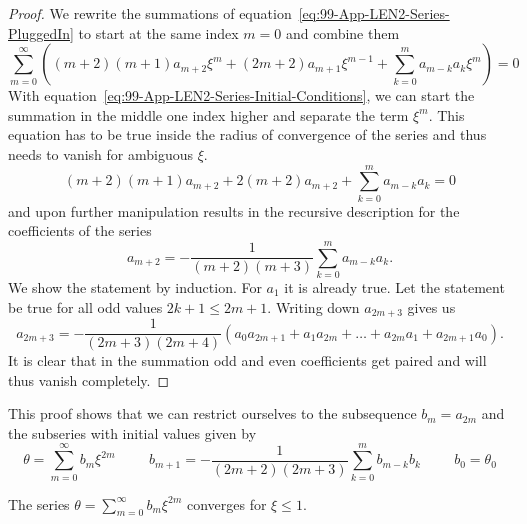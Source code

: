 \begin{proof}
	We rewrite the summations of equation~\ref{eq:99-App-LEN2-Series-PluggedIn} to start at the
	same index $m=0$ and combine them
	\begin{equation}
		\sum\limits_{m=0}^\infty\left((m+2)(m+1)a_{m+2}\xi^{m}+(2m+2)a_{m+1}\xi^{m-1} + \sum\limits_{k=0}^m a_{m-k}a_k\xi^m\right) = 0
		\label{eq:99-App-LE-New-Recursive-1}
	\end{equation}
	With equation~\ref{eq:99-App-LEN2-Series-Initial-Conditions}, we can start the summation
	in the middle one index higher and separate the term $\xi^m$.
	This equation has to be true
	inside the radius of convergence of the series and thus needs to vanish for ambiguous $\xi$.
	\begin{equation}
		(m+2)(m+1)a_{m+2}+2(m+2)a_{m+2}+\sum\limits_{k=0}^m a_{m-k}a_k = 0
		\label{eq:99-App-LE-New-Recursive-2}
	\end{equation}
	and upon further manipulation results in the recursive description for the coefficients
	of the series
	\begin{equation}
		a_{m+2} = -\frac{1}{(m+2)(m+3)}\sum\limits_{k=0}^m a_{m-k}a_k.
		\label{eq:99-App-LEN2-Recursive-Coefficients}
	\end{equation}
	We show the statement by induction.
	For $a_1$ it is already true.
	Let the statement be true for all odd values $2k+1\leq2m+1$.
	Writing down $a_{2m+3}$ gives us
	\begin{equation}
		a_{2m+3} = -\frac{1}{(2m+3)(2m+4)}\left(a_0 a_{2m+1}+a_1 a_{2m}+\dots+a_{2m}a_1+a_{2m+1}a_0\right).
		\label{eq:99-App-LE-New-Recursive-3}
	\end{equation}
	It is clear that in the summation odd and even coefficients get paired and will thus
	vanish completely.
\end{proof}
This proof shows that we can restrict ourselves to the subsequence $b_m=a_{2m}$ and the subseries with initial values given by
\begin{equation}
	\theta = \sum\limits_{m=0}^\infty b_m\xi^{2m} \hspace{1cm} b_{m+1} =
	-\frac{1}{(2m+2)(2m+3)}\sum\limits_{k=0}^m b_{m-k}b_k \hspace{1cm} b_0=\theta_0
	\label{eq:99-App-LEN2-bn-Definition}
\end{equation}
\begin{theorem}
	The series $\theta=\sum\limits_{m=0}^\infty b_m\xi^{2m}$ converges for $\xi\leq1$.
\end{theorem}
